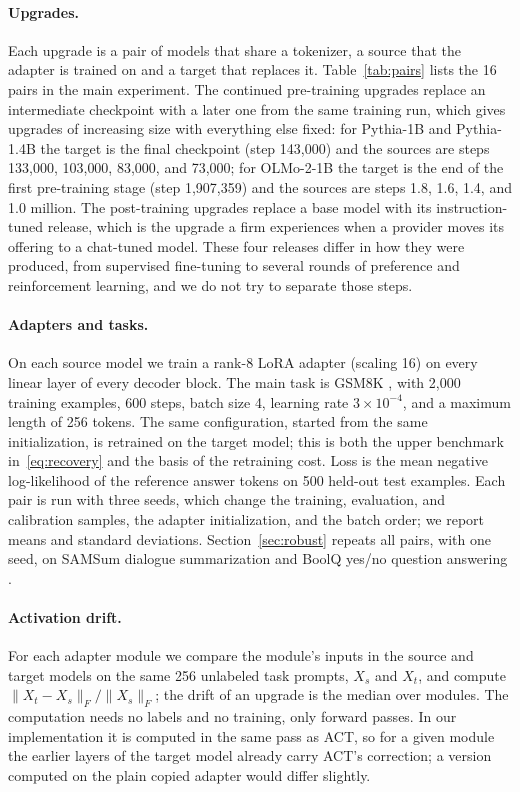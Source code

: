 \documentclass[ijds,blindrev]{informs4}
\begin{document}
\paragraph{Upgrades.} Each upgrade is a pair of models that share a tokenizer, a source that the adapter is trained on and a target that replaces it. Table~\ref{tab:pairs} lists the 16 pairs in the main experiment. The continued pre-training upgrades replace an intermediate checkpoint with a later one from the same training run, which gives upgrades of increasing size with everything else fixed: for Pythia-1B and Pythia-1.4B the target is the final checkpoint (step 143{,}000) and the sources are steps 133{,}000, 103{,}000, 83{,}000, and 73{,}000; for OLMo-2-1B the target is the end of the first pre-training stage (step 1{,}907{,}359) and the sources are steps 1.8, 1.6, 1.4, and 1.0 million. The post-training upgrades replace a base model with its instruction-tuned release, which is the upgrade a firm experiences when a provider moves its offering to a chat-tuned model. These four releases differ in how they were produced, from supervised fine-tuning to several rounds of preference and reinforcement learning, and we do not try to separate those steps.

\paragraph{Adapters and tasks.} On each source model we train a rank-8 LoRA adapter (scaling 16) on every linear layer of every decoder block. The main task is GSM8K \citep{cobbe2021gsm8k}, with 2{,}000 training examples, 600 steps, batch size 4, learning rate $3\times10^{-4}$, and a maximum length of 256 tokens. The same configuration, started from the same initialization, is retrained on the target model; this is both the upper benchmark in~\eqref{eq:recovery} and the basis of the retraining cost. Loss is the mean negative log-likelihood of the reference answer tokens on 500 held-out test examples. Each pair is run with three seeds, which change the training, evaluation, and calibration samples, the adapter initialization, and the batch order; we report means and standard deviations. Section~\ref{sec:robust} repeats all pairs, with one seed, on SAMSum dialogue summarization \citep{gliwa2019samsum} and BoolQ yes/no question answering \citep{clark2019boolq}.

\paragraph{Activation drift.} For each adapter module we compare the module's inputs in the source and target models on the same 256 unlabeled task prompts, $X_s$ and $X_t$, and compute $\|X_t-X_s\|_F/\|X_s\|_F$; the drift of an upgrade is the median over modules. The computation needs no labels and no training, only forward passes. In our implementation it is computed in the same pass as ACT, so for a given module the earlier layers of the target model already carry ACT's correction; a version computed on the plain copied adapter would differ slightly.
\end{document}
